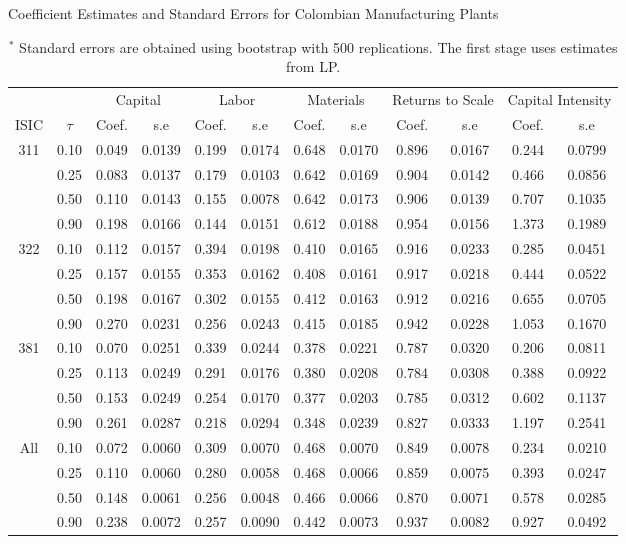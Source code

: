 \documentclass[12pt]{article}
\begin{document}
\begin{appendices}
\begin{table}[H]
\centering
\caption{Coefficient Estimates and Standard Errors for Colombian Manufacturing Plants}
\small
\begin{tabular}{cccccccccccc}
  \hline\hline & & \multicolumn{2}{c}{Capital}  & \multicolumn{2}{c}{Labor} & \multicolumn{2}{c}{Materials} & \multicolumn{2}{c}{Returns to Scale} & \multicolumn{2}{c}{Capital Intensity}\\ \cmidrule(lr){3-4} \cmidrule(lr){5-6} \cmidrule(lr){7-8} \cmidrule(lr){9-10} \cmidrule(lr){11-12}ISIC & $\tau$ & Coef. & s.e & Coef. & s.e & Coef. & s.e & Coef. & s.e & Coef. & s.e \\ 
  \hline
311 & 0.10 & 0.049 & 0.0139 & 0.199 & 0.0174 & 0.648 & 0.0170 & 0.896 & 0.0167 & 0.244 & 0.0799 \\ 
   & 0.25 & 0.083 & 0.0137 & 0.179 & 0.0103 & 0.642 & 0.0169 & 0.904 & 0.0142 & 0.466 & 0.0856 \\ 
   & 0.50 & 0.110 & 0.0143 & 0.155 & 0.0078 & 0.642 & 0.0173 & 0.906 & 0.0139 & 0.707 & 0.1035 \\ 
   & 0.90 & 0.198 & 0.0166 & 0.144 & 0.0151 & 0.612 & 0.0188 & 0.954 & 0.0156 & 1.373 & 0.1989 \\ 
  322 & 0.10 & 0.112 & 0.0157 & 0.394 & 0.0198 & 0.410 & 0.0165 & 0.916 & 0.0233 & 0.285 & 0.0451 \\ 
   & 0.25 & 0.157 & 0.0155 & 0.353 & 0.0162 & 0.408 & 0.0161 & 0.917 & 0.0218 & 0.444 & 0.0522 \\ 
   & 0.50 & 0.198 & 0.0167 & 0.302 & 0.0155 & 0.412 & 0.0163 & 0.912 & 0.0216 & 0.655 & 0.0705 \\ 
   & 0.90 & 0.270 & 0.0231 & 0.256 & 0.0243 & 0.415 & 0.0185 & 0.942 & 0.0228 & 1.053 & 0.1670 \\ 
  381 & 0.10 & 0.070 & 0.0251 & 0.339 & 0.0244 & 0.378 & 0.0221 & 0.787 & 0.0320 & 0.206 & 0.0811 \\ 
   & 0.25 & 0.113 & 0.0249 & 0.291 & 0.0176 & 0.380 & 0.0208 & 0.784 & 0.0308 & 0.388 & 0.0922 \\ 
   & 0.50 & 0.153 & 0.0249 & 0.254 & 0.0170 & 0.377 & 0.0203 & 0.785 & 0.0312 & 0.602 & 0.1137 \\ 
   & 0.90 & 0.261 & 0.0287 & 0.218 & 0.0294 & 0.348 & 0.0239 & 0.827 & 0.0333 & 1.197 & 0.2541 \\ 
  All & 0.10 & 0.072 & 0.0060 & 0.309 & 0.0070 & 0.468 & 0.0070 & 0.849 & 0.0078 & 0.234 & 0.0210 \\ 
   & 0.25 & 0.110 & 0.0060 & 0.280 & 0.0058 & 0.468 & 0.0066 & 0.859 & 0.0075 & 0.393 & 0.0247 \\ 
   & 0.50 & 0.148 & 0.0061 & 0.256 & 0.0048 & 0.466 & 0.0066 & 0.870 & 0.0071 & 0.578 & 0.0285 \\ 
   & 0.90 & 0.238 & 0.0072 & 0.257 & 0.0090 & 0.442 & 0.0073 & 0.937 & 0.0082 & 0.927 & 0.0492 \\ 
   \hline
\end{tabular}
\caption*{\footnotesize $^{*}$ Standard errors are obtained using bootstrap with 500 replications. The first stage uses estimates from LP.}
\label{COLestLP}
\end{table}


\end{appendices}
\end{document}
